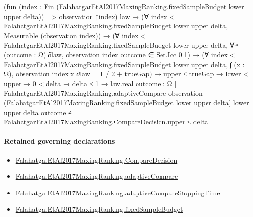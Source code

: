\documentclass[10pt]{article}
\begin{document}
\begin{ReviewVerbatim}
          (fun (index : Fin (FalahatgarEtAl2017MaxingRanking.fixedSampleBudget lower upper delta)) =>
            observation ↑index)
          law →
        (∀ index < FalahatgarEtAl2017MaxingRanking.fixedSampleBudget lower upper delta,
            Measurable (observation index)) →
          (∀ index < FalahatgarEtAl2017MaxingRanking.fixedSampleBudget lower upper delta,
              ∀ᵐ (outcome : Ω) ∂law, observation index outcome ∈ Set.Icc 0 1) →
            (∀ index < FalahatgarEtAl2017MaxingRanking.fixedSampleBudget lower upper delta,
                ∫ (x : Ω), observation index x ∂law = 1 / 2 + trueGap) →
              upper ≤ trueGap →
                lower < upper →
                  0 < delta →
                    delta ≤ 1 →
                      law.real
                          {outcome : Ω |
                            FalahatgarEtAl2017MaxingRanking.adaptiveCompare observation
                                (FalahatgarEtAl2017MaxingRanking.fixedSampleBudget lower upper delta) lower upper delta
                                outcome ≠
                              FalahatgarEtAl2017MaxingRanking.CompareDecision.upper} ≤
                        delta
\end{ReviewVerbatim}

\paragraph{Retained governing declarations}
\begin{itemize}\raggedright
\item \hyperlink{governing-declaration-3723216c72fc3dc8}{Falahatgar\allowbreak{}Et\allowbreak{}Al2017\allowbreak{}Maxing\allowbreak{}Ranking.\allowbreak{}Compare\allowbreak{}Decision}
\item \hyperlink{paper-prerequisite-8b894f32c9664991}{Falahatgar\allowbreak{}Et\allowbreak{}Al2017\allowbreak{}Maxing\allowbreak{}Ranking.\allowbreak{}adaptive\allowbreak{}Compare}
\item \hyperlink{governing-declaration-ecdbc5b05a16f3c0}{Falahatgar\allowbreak{}Et\allowbreak{}Al2017\allowbreak{}Maxing\allowbreak{}Ranking.\allowbreak{}adaptive\allowbreak{}Compare\allowbreak{}Stopping\allowbreak{}Time}
\item \hyperlink{governing-declaration-4b4daf4bb2493573}{Falahatgar\allowbreak{}Et\allowbreak{}Al2017\allowbreak{}Maxing\allowbreak{}Ranking.\allowbreak{}fixed\allowbreak{}Sample\allowbreak{}Budget}
\end{itemize}
\end{document}
